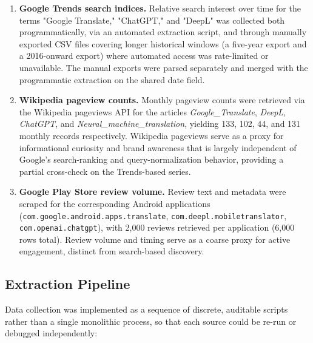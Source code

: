 \documentclass[11pt]{article}
\begin{document}
\begin{enumerate}
    \item \textbf{Google Trends search indices.} Relative search interest over time for the terms "Google Translate," "ChatGPT," and "DeepL" was collected both programmatically, via an automated extraction script, and through manually exported CSV files covering longer historical windows (a five-year export and a 2016-onward export) where automated access was rate-limited or unavailable. The manual exports were parsed separately and merged with the programmatic extraction on the shared date field.
    \item \textbf{Wikipedia pageview counts.} Monthly pageview counts were retrieved via the Wikipedia pageviews API for the articles \textit{Google\_Translate}, \textit{DeepL}, \textit{ChatGPT}, and \textit{Neural\_machine\_translation}, yielding 133, 102, 44, and 131 monthly records respectively. Wikipedia pageviews serve as a proxy for informational curiosity and brand awareness that is largely independent of Google's search-ranking and query-normalization behavior, providing a partial cross-check on the Trends-based series.
    \item \textbf{Google Play Store review volume.} Review text and metadata were scraped for the corresponding Android applications (\texttt{com.google.android.apps.translate}, \texttt{com.deepl.mobiletranslator}, \texttt{com.openai.chatgpt}), with 2,000 reviews retrieved per application (6,000 rows total). Review volume and timing serve as a coarse proxy for active engagement, distinct from search-based discovery.
\end{enumerate}

\subsection{Extraction Pipeline}

Data collection was implemented as a sequence of discrete, auditable scripts rather than a single monolithic process, so that each source could be re-run or debugged independently:
\end{document}
